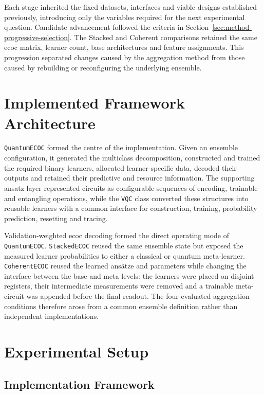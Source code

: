 \documentclass[]{UCD_CS_MSc_AAI_Report}
\begin{document}
Each stage inherited the fixed datasets, interfaces and viable designs established previously, introducing only the variables required for the next experimental question. Candidate advancement followed the criteria in Section~\ref{sec:method-progressive-selection}. The Stacked and Coherent comparisons retained the same \ac{ecoc} matrix, learner count, base architectures and feature assignments. This progression separated changes caused by the aggregation method from those caused by rebuilding or reconfiguring the underlying ensemble.

\section{Implemented Framework Architecture}
\label{sec:method-framework-architecture}

\texttt{QuantumECOC} formed the centre of the implementation. Given an ensemble configuration, it generated the multiclass decomposition, constructed and trained the required binary learners, allocated learner-specific data, decoded their outputs and retained their predictive and resource information. The supporting ansatz layer represented circuits as configurable sequences of encoding, trainable and entangling operations, while the \texttt{VQC} class converted these structures into reusable learners with a common interface for construction, training, probability prediction, resetting and tracing.

Validation-weighted \ac{ecoc} decoding formed the direct operating mode of \texttt{QuantumECOC}. \texttt{StackedECOC} reused the same ensemble state but exposed the measured learner probabilities to either a classical or quantum meta-learner. \texttt{CoherentECOC} reused the learned ansätze and parameters while changing the interface between the base and meta levels: the learners were placed on disjoint registers, their intermediate measurements were removed and a trainable meta-circuit was appended before the final readout. The four evaluated aggregation conditions therefore arose from a common ensemble definition rather than independent implementations.

\section{Experimental Setup}
\label{sec:method-setup}

\subsection{Implementation Framework}
\end{document}

